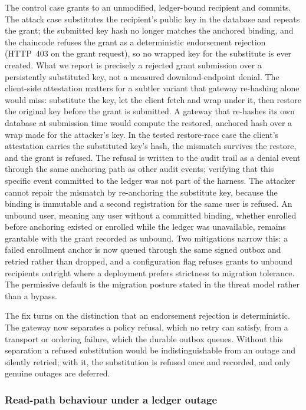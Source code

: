 \documentclass[preprint,12pt]{elsarticle}
\begin{document}
The control case grants to an unmodified, ledger-bound recipient and commits.
The attack case substitutes the recipient's public key in the database and
repeats the grant; the submitted key hash no longer matches the anchored
binding, and the chaincode refuses the grant as a deterministic endorsement
rejection (HTTP~403 on the grant request), so no wrapped key for the
substitute is ever created. What we report is precisely a rejected grant
submission over a persistently substituted key, not a measured
download-endpoint denial. The client-side attestation matters for a subtler
variant that gateway re-hashing alone would miss: substitute the key, let the
client fetch and wrap under it, then restore the original key before the
grant is submitted. A gateway that re-hashes its own database at submission
time would compute the restored, anchored hash over a wrap made for the
attacker's key. In the tested restore-race case the client's attestation
carries the substituted key's hash, the mismatch survives the restore, and
the grant is refused. The refusal is written to the audit trail as a denial
event through the same anchoring path as other audit events; verifying that
this specific event committed to the ledger was not part of the harness. The
attacker cannot repair the mismatch by re-anchoring the substitute key,
because the binding is immutable and a second registration for the same user
is refused. An unbound user, meaning any user without a committed binding,
whether enrolled before anchoring existed or enrolled while the ledger was
unavailable, remains grantable with the grant recorded as unbound. Two
mitigations narrow this: a failed enrollment anchor is now queued through the
same signed outbox and retried rather than dropped, and a configuration flag
refuses grants to unbound recipients outright where a deployment prefers
strictness to migration tolerance. The permissive default is the migration
posture stated in the threat model rather than a bypass.

The fix turns on the distinction that an endorsement rejection is
deterministic. The gateway now separates a policy refusal, which no retry can
satisfy, from a transport or ordering failure, which the durable outbox queues.
Without this separation a refused substitution would be indistinguishable from
an outage and silently retried; with it, the substitution is refused once and
recorded, and only genuine outages are deferred.

\subsubsection{Read-path behaviour under a ledger outage}
\label{sec:exp_failclosed}
\end{document}

